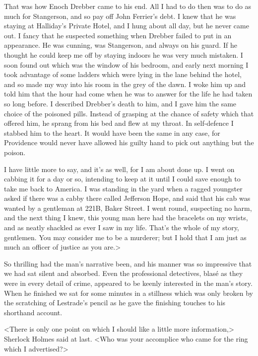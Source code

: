 That was how Enoch Drebber came to his end. All I had to do then was to do as much for Stangerson, and so pay off John Ferrier's debt. I knew that he was staying at Halliday's Private Hotel, and I hung about all day, but he never came out. I fancy that he suspected something when Drebber failed to put in an appearance. He was cunning, was Stangerson, and always on his guard. If he thought he could keep me off by staying indoors he was very much mistaken. I soon found out which was the window of his bedroom, and early next morning I took advantage of some ladders which were lying in the lane behind the hotel, and so made my way into his room in the grey of the dawn. I woke him up and told him that the hour had come when he was to answer for the life he had taken so long before. I described Drebber's death to him, and I gave him the same choice of the poisoned pills. Instead of grasping at the chance of safety which that offered him, he sprang from his bed and flew at my throat. In self-defence I stabbed him to the heart. It would have been the same in any case, for Providence would never have allowed his guilty hand to pick out anything but the poison.

I have little more to say, and it's as well, for I am about done up. I went on cabbing it for a day or so, intending to keep at it until I could save enough to take me back to America. I was standing in the yard when a ragged youngster asked if there was a cabby there called Jefferson Hope, and said that his cab was wanted by a gentleman at 221B, Baker Street. I went round, suspecting no harm, and the next thing I knew, this young man here had the bracelets on my wrists, and as neatly shackled as ever I saw in my life. That's the whole of my story, gentlemen. You may consider me to be a murderer; but I hold that I am just as much an officer of justice as you are.>

So thrilling had the man's narrative been, and his manner was so impressive that we had sat silent and absorbed. Even the professional detectives, blasé as they were in every detail of crime, appeared to be keenly interested in the man's story. When he finished we sat for some minutes in a stillness which was only broken by the scratching of Lestrade's pencil as he gave the finishing touches to his shorthand account.

<There is only one point on which I should like a little more information,> Sherlock Holmes said at last. <Who was your accomplice who came for the ring which I advertised?>

